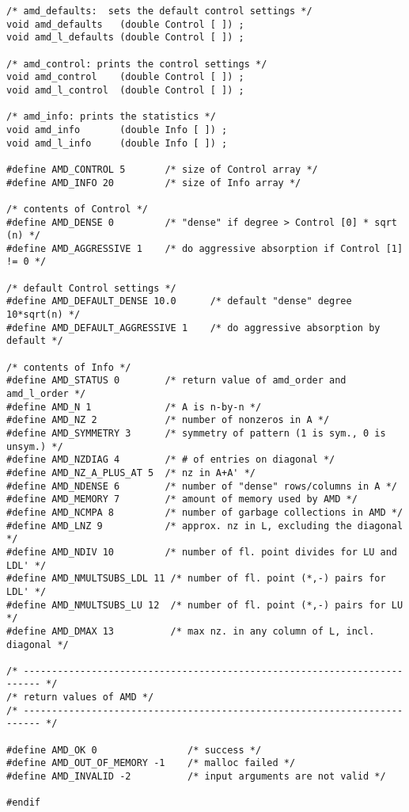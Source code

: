 \documentclass[11pt]{article}
\begin{document}
{\begin{verbatim}
/* amd_defaults:  sets the default control settings */
void amd_defaults   (double Control [ ]) ;
void amd_l_defaults (double Control [ ]) ;

/* amd_control: prints the control settings */
void amd_control    (double Control [ ]) ;
void amd_l_control  (double Control [ ]) ;

/* amd_info: prints the statistics */
void amd_info       (double Info [ ]) ;
void amd_l_info     (double Info [ ]) ;

#define AMD_CONTROL 5       /* size of Control array */
#define AMD_INFO 20         /* size of Info array */

/* contents of Control */
#define AMD_DENSE 0         /* "dense" if degree > Control [0] * sqrt (n) */
#define AMD_AGGRESSIVE 1    /* do aggressive absorption if Control [1] != 0 */

/* default Control settings */
#define AMD_DEFAULT_DENSE 10.0      /* default "dense" degree 10*sqrt(n) */
#define AMD_DEFAULT_AGGRESSIVE 1    /* do aggressive absorption by default */

/* contents of Info */
#define AMD_STATUS 0        /* return value of amd_order and amd_l_order */
#define AMD_N 1             /* A is n-by-n */
#define AMD_NZ 2            /* number of nonzeros in A */ 
#define AMD_SYMMETRY 3      /* symmetry of pattern (1 is sym., 0 is unsym.) */
#define AMD_NZDIAG 4        /* # of entries on diagonal */
#define AMD_NZ_A_PLUS_AT 5  /* nz in A+A' */
#define AMD_NDENSE 6        /* number of "dense" rows/columns in A */
#define AMD_MEMORY 7        /* amount of memory used by AMD */
#define AMD_NCMPA 8         /* number of garbage collections in AMD */
#define AMD_LNZ 9           /* approx. nz in L, excluding the diagonal */
#define AMD_NDIV 10         /* number of fl. point divides for LU and LDL' */
#define AMD_NMULTSUBS_LDL 11 /* number of fl. point (*,-) pairs for LDL' */
#define AMD_NMULTSUBS_LU 12  /* number of fl. point (*,-) pairs for LU */
#define AMD_DMAX 13          /* max nz. in any column of L, incl. diagonal */

/* ------------------------------------------------------------------------- */
/* return values of AMD */
/* ------------------------------------------------------------------------- */

#define AMD_OK 0                /* success */
#define AMD_OUT_OF_MEMORY -1    /* malloc failed */
#define AMD_INVALID -2          /* input arguments are not valid */

#endif
\end{verbatim}
}

\newpage



\end{document}
